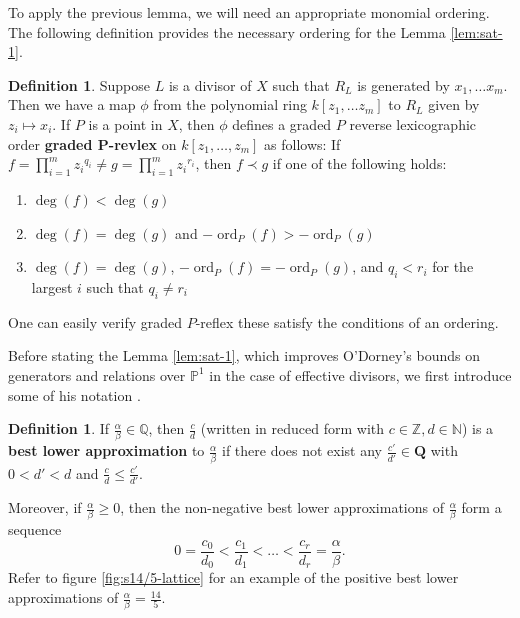 \documentclass{amsart}
\theoremstyle{plain}
\theoremstyle{definition}
\newtheorem{defn}[thm]{Definition}
\theoremstyle{remark}
\numberwithin{equation}{section}
\newcommand\BQ{{\mathbb Q}}
\DeclareMathOperator{\ord}{ord}
\newcommand \halfcan{L}
\begin{document}
To apply the previous lemma, we will need an appropriate monomial ordering.  
The following definition provides the necessary ordering for the Lemma \ref{lem:sat-1}.
\begin{defn}
Suppose $\halfcan$ is a divisor of $X$ such that $R_\halfcan$ is generated by $x_1, \ldots x_m$.  Then we have a map $\phi$ from the polynomial ring $k[z_1, \ldots z_m]$ to $R_\halfcan$ given by $z_i\mapsto x_i$.   If $P$ is a point in $X$, then $\phi$ defines a graded $P$ reverse lexicographic order {\bf{graded P-revlex}} on $k[z_1, \ldots, z_m]$ as follows: 
If $f=\prod_{i=1}^m {z_i}^{q_i}\ne g=\prod_{i=1}^m {z_i}^{r_i}$, then $f\prec g$ if one of the following holds:
\begin{enumerate}
\item $\deg(f) < \deg(g)$
\item $\deg(f) = \deg(g)$ and $-\ord_P(f) > -\ord_P(g)$
\item $\deg(f) = \deg(g)$, $-\ord_P(f) = -\ord_P(g)$, and $q_i<r_i$ for the largest $i$ such that $q_i\ne r_i$
\end{enumerate}
\end{defn}
\noindent One can easily verify graded $P$-reflex these satisfy the conditions of an ordering.  

Before stating the Lemma \ref{lem:sat-1}, which improves O'Dorney's bounds on generators and relations over $\mathbb{P}^1$ \cite[Theorem 8]{dorney:canonical} in the case of effective divisors, we first introduce some of his notation \cite{dorney:canonical}. 

\begin{defn}\label{den:lower-approximation}
If $\frac{\alpha}{\beta}\in \BQ$, then $\frac{c}{d}$ (written in reduced form with $c\in \mathbb{Z}, d\in \mathbb{N}$) is a {\bf{best lower approximation}} to $\frac{\alpha}{\beta}$ if there does not exist any $\frac{c'}{d'}\in \mathbf{Q}$ with $0<d'<d$ and $\frac{c}{d}\le \frac{c'}{d'}$. 
\end{defn}
Moreover, if $\frac{\alpha}{\beta}\ge 0$, then the non-negative best lower approximations of $\frac{\alpha}{\beta}$ form a sequence
\[
	0=\frac{c_0}{d_0} < \frac{c_1}{d_1} < \ldots < \frac{c_r}{d_r} = \frac{\alpha}{\beta}.
\]
Refer to figure \ref{fig:s14/5-lattice} for an example of the positive best lower approximations of $\frac{\alpha}{\beta}=\frac{14}{5}$.  
\end{document}
